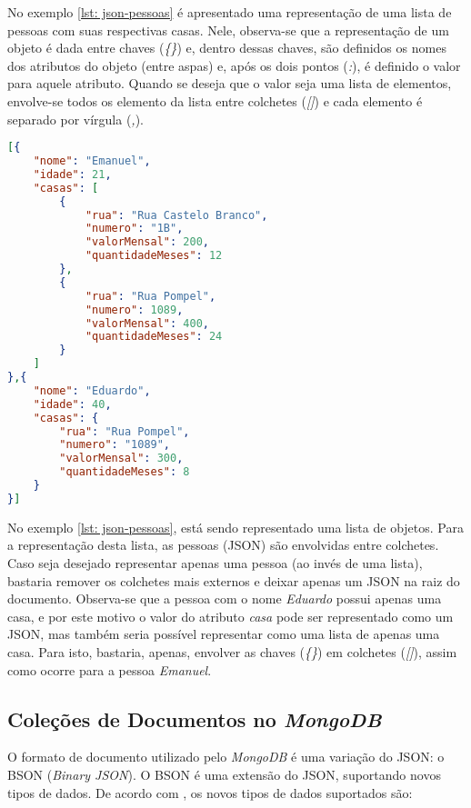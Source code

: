 No exemplo \ref{lst: json-pessoas} é apresentado uma representação de uma lista de pessoas com suas respectivas casas. Nele, observa-se que a representação de um objeto é dada entre chaves (\textit{\{\}}) e, dentro dessas chaves, são definidos os nomes dos atributos do objeto (entre aspas) e, após os dois pontos (\textit{:}), é definido o valor para aquele atributo. Quando se deseja que o valor seja uma lista de elementos, envolve-se todos os elemento da lista entre colchetes (\textit{[]}) e cada elemento é separado por vírgula (\textit{,}).


\begin{lstlisting}[language=json, caption={JSON Representando Várias Pessoas Com Suas casas\label{lst: json-pessoas}}]
[{
    "nome": "Emanuel",
    "idade": 21,
    "casas": [
        {
            "rua": "Rua Castelo Branco",
            "numero": "1B",
            "valorMensal": 200,
            "quantidadeMeses": 12
        },
        {
            "rua": "Rua Pompel",
            "numero": 1089,
            "valorMensal": 400,
            "quantidadeMeses": 24
        }
    ]
},{
    "nome": "Eduardo",
    "idade": 40,
    "casas": {
        "rua": "Rua Pompel",
        "numero": "1089",
        "valorMensal": 300,
        "quantidadeMeses": 8
    }
}]
\end{lstlisting}
    
No exemplo \ref{lst: json-pessoas}, está sendo representado uma lista de objetos. Para a representação desta lista, as pessoas (JSON) são envolvidas entre colchetes. Caso seja desejado representar apenas uma pessoa (ao invés de uma lista), bastaria remover os colchetes mais externos e deixar apenas um JSON na raiz do documento. Observa-se que a pessoa com o nome \textit{Eduardo} possui apenas uma casa, e por este motivo o valor do atributo \textit{casa} pode ser representado como um JSON, mas também seria possível representar como uma lista de apenas uma casa. Para isto, bastaria, apenas, envolver as chaves (\textit{\{\}}) em colchetes (\textit{[]}), assim como ocorre para a pessoa \textit{Emanuel}.

\subsection{Coleções de Documentos no \textit{MongoDB}}
    
O formato de documento utilizado pelo \textit{MongoDB} é uma variação do JSON: o BSON (\textit{Binary JSON}). O BSON é uma extensão do JSON, suportando novos tipos de dados. De acordo com , os novos tipos de dados suportados são:

